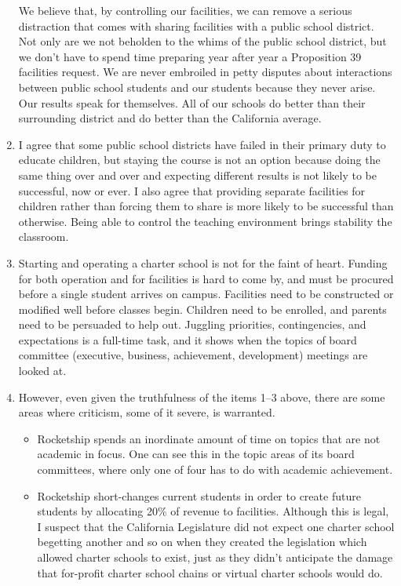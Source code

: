 \begin{enumerate}[topsep=0.3\baselineskip,itemsep=0.25\baselineskip]
  We believe that, by controlling our facilities, we can remove a serious distraction that comes with sharing facilities with a public school district. Not only are we not beholden to the whims of the public school district, but we don't have to spend time preparing year after year a Proposition 39 facilities request. We are never embroiled in petty disputes about interactions between public school students and our students because they never arise. Our results speak for themselves. All of our schools do better than their surrounding district and do better than the California average.
  \item I agree that some public school districts have failed in their primary duty to educate children, but staying the course is not an option because doing the same thing over and over and expecting different results is not likely to be successful, now or ever.
  I also agree that providing separate facilities for children rather than forcing them to share is more likely to be successful than otherwise. Being able to control the teaching environment brings stability the classroom.
  \item Starting and operating a charter school is not for the faint of heart. Funding for both operation and for facilities is hard to come by, and must be procured before a single student arrives on campus. Facilities need to be constructed or modified well before classes begin. Children need to be enrolled, and parents need to be persuaded to help out. Juggling priorities, contingencies, and expectations is a full-time task, and it shows when the topics of board committee (executive, business, achievement, development) meetings are looked at.
    \item However, even given the truthfulness of the items 1–3 above, there are some areas where criticism, some of it severe, is warranted.
    \begin{itemize}[topsep=0.125\baselineskip,itemsep=0.25\baselineskip]
      \item Rocketship spends an inordinate amount of time on topics that are not academic in focus. One can see this in the topic areas of its board committees, where only one of four has to do with academic achievement.
      \item Rocketship short-changes current students in order to create future students by allocating 20\% of revenue to facilities. Although this is  legal, I suspect that the California Legislature did not expect one charter school begetting another and so on when they created the legislation which allowed charter schools to exist, just as they didn't anticipate the damage that for-profit charter school chains or virtual charter schools would do.

\end{itemize}
\end{enumerate}
